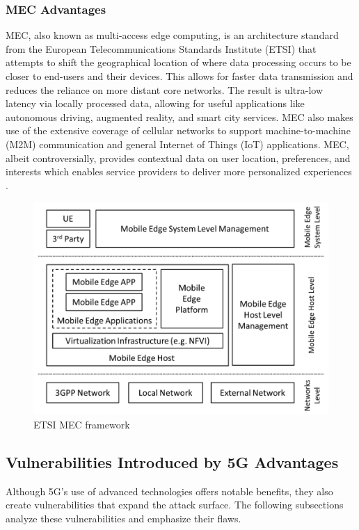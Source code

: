 \documentclass[acmtog]{acmart}
\begin{document}
\subsubsection{MEC Advantages} MEC, also known as multi-access edge computing, is an architecture standard from the European Telecommunications Standards Institute (ETSI) that attempts to shift the geographical location of where data processing occurs to be closer to end-users and their devices. This allows for faster data transmission and reduces the reliance on more distant core networks. The result is ultra-low latency via locally processed data, allowing for useful applications like autonomous driving, augmented reality, and smart city services. \cite{ref6_1} MEC also makes use of the extensive coverage of cellular networks to support machine-to-machine (M2M) communication and general Internet of Things (IoT) applications. MEC, albeit controversially, provides contextual data on user location, preferences, and interests which enables service providers to deliver more personalized experiences \cite{ref6_1}.
\begin{figure}[h]
  \centering
  \includegraphics[width=\linewidth]{mec.png}
  \caption{ETSI MEC framework \cite{ref6_1}}
\end{figure}

\subsection{Vulnerabilities Introduced by 5G Advantages}
Although 5G’s use of advanced technologies offers notable benefits, they also create vulnerabilities that expand the attack surface. The following subsections analyze these vulnerabilities and emphasize their flaws.
\end{document}
